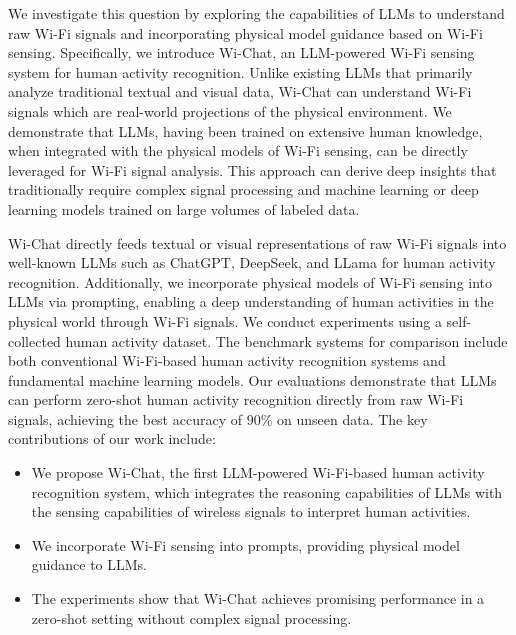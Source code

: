 
We investigate this question by exploring the capabilities of LLMs to understand raw Wi-Fi signals and incorporating physical model guidance based on Wi-Fi sensing. Specifically, we introduce Wi-Chat, an LLM-powered Wi-Fi sensing system for human activity recognition. Unlike existing LLMs that primarily analyze traditional textual and visual data, Wi-Chat can understand Wi-Fi signals which are real-world projections of the physical environment. We demonstrate that LLMs, having been trained on extensive human knowledge, when integrated with the physical models of Wi-Fi sensing, can be directly leveraged for Wi-Fi signal analysis. This approach can derive deep insights that traditionally require complex signal processing and machine learning or deep learning models trained on large volumes of labeled data.

Wi-Chat directly feeds textual or visual representations of raw Wi-Fi signals into well-known LLMs such as ChatGPT, DeepSeek, and LLama for human activity recognition. Additionally, we incorporate physical models of Wi-Fi sensing into LLMs via prompting, enabling a deep understanding of human activities in the physical world through Wi-Fi signals.
We conduct experiments using a self-collected human activity dataset. The benchmark systems for comparison include both conventional Wi-Fi-based human activity recognition systems and fundamental machine learning models. Our evaluations demonstrate that LLMs can perform zero-shot human activity recognition directly from raw Wi-Fi signals, achieving the best accuracy of $90\%$ on unseen data. The key contributions of our work include:

\begin{itemize}
  \item We propose Wi-Chat, the first LLM-powered Wi-Fi-based human activity recognition system, which integrates the reasoning capabilities of LLMs with the sensing capabilities of wireless signals to interpret human activities.
  \vspace{-3mm}
  \item We incorporate Wi-Fi sensing into prompts, providing physical model guidance to LLMs.
  \vspace{-3mm}
  \item The experiments show that Wi-Chat achieves promising performance in a zero-shot setting without complex signal processing.
\end{itemize}


